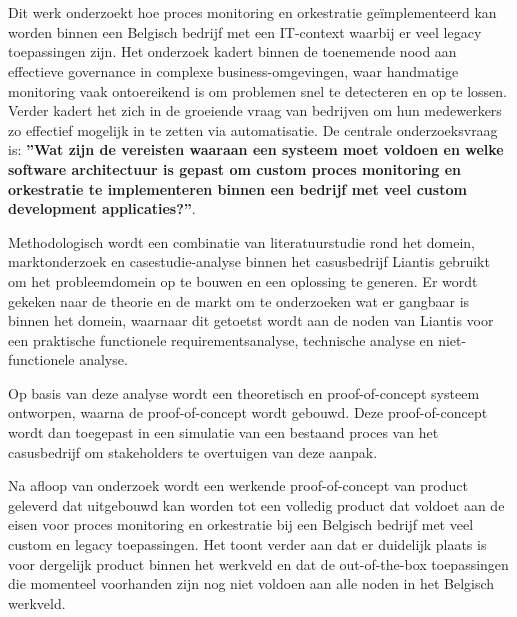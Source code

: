 \chapter*{}
\label{ch:abstract}

Dit werk onderzoekt hoe proces monitoring en orkestratie geïmplementeerd kan worden binnen een Belgisch bedrijf met een IT-context waarbij er veel legacy toepassingen zijn. Het onderzoek kadert binnen de toenemende nood aan effectieve governance in complexe business-omgevingen, waar handmatige monitoring vaak ontoereikend is om problemen snel te detecteren en op te lossen. Verder kadert het zich in de groeiende vraag van bedrijven om hun medewerkers zo effectief mogelijk in te zetten via automatisatie. De centrale onderzoeksvraag is: \textbf{”Wat zijn de vereisten waaraan een systeem moet voldoen en welke software architectuur is gepast om custom proces monitoring en orkestratie te implementeren binnen een bedrijf met veel custom development applicaties?”}.\newline

Methodologisch wordt een combinatie van literatuurstudie rond het domein, marktonderzoek en casestudie-analyse binnen het casusbedrijf Liantis gebruikt om het probleemdomein op te bouwen en een oplossing te generen. Er wordt gekeken naar de theorie en de markt om te onderzoeken wat er gangbaar is binnen het domein, waarnaar dit getoetst wordt aan de noden van Liantis voor een praktische functionele requirementsanalyse, technische analyse en niet-functionele analyse. \newline

Op basis van deze analyse wordt een theoretisch en proof-of-concept systeem ontworpen, waarna de proof-of-concept wordt gebouwd. Deze proof-of-concept wordt dan toegepast in een simulatie van een bestaand proces van het casusbedrijf om stakeholders te overtuigen van deze aanpak. \newline

Na afloop van onderzoek wordt een werkende proof-of-concept van product geleverd dat uitgebouwd kan worden tot een volledig product dat voldoet aan de eisen voor proces monitoring en orkestratie bij een Belgisch bedrijf met veel custom en legacy toepassingen. Het toont verder aan dat er duidelijk plaats is voor dergelijk product binnen het werkveld en dat de out-of-the-box toepassingen die momenteel voorhanden zijn nog niet voldoen aan alle noden in het Belgisch werkveld. 